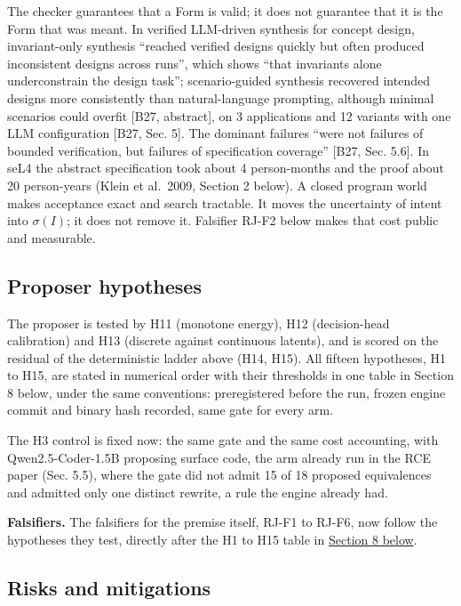 \documentclass[10pt,letterpaper]{article}
\begin{document}
The checker guarantees that a Form is valid; it does not guarantee that
it is the Form that was meant. In verified LLM-driven synthesis for
concept design, invariant-only synthesis ``reached verified designs
quickly but often produced inconsistent designs across runs'', which
shows ``that invariants alone underconstrain the design task'';
scenario-guided synthesis recovered intended designs more consistently
than natural-language prompting, although minimal scenarios could
overfit {[}B27, abstract{]}, on 3 applications and 12 variants with one
LLM configuration {[}B27, Sec. 5{]}. The dominant failures ``were not
failures of bounded verification, but failures of specification
coverage'' {[}B27, Sec. 5.6{]}. In seL4 the abstract specification took
about 4 person-months and the proof about 20 person-years (Klein et
al.~2009, Section 2 below). A closed program world makes acceptance
exact and search tractable. It moves the uncertainty of intent into
\(\sigma(I)\); it does not remove it. Falsifier RJ-F2 below makes that
cost public and measurable.

\subsection{Proposer hypotheses}\label{proposer-hypotheses}

The proposer is tested by H11 (monotone energy), H12 (decision-head
calibration) and H13 (discrete against continuous latents), and is
scored on the residual of the deterministic ladder above (H14, H15). All
fifteen hypotheses, H1 to H15, are stated in numerical order with their
thresholds in one table in Section 8 below, under the same conventions:
preregistered before the run, frozen engine commit and binary hash
recorded, same gate for every arm.

The H3 control is fixed now: the same gate and the same cost accounting,
with Qwen2.5-Coder-1.5B proposing surface code, the arm already run in
the RCE paper (Sec. 5.5), where the gate did not admit 15 of 18 proposed
equivalences and admitted only one distinct rewrite, a rule the engine
already had.

\textbf{Falsifiers.} The falsifiers for the premise itself, RJ-F1 to
RJ-F6, now follow the hypotheses they test, directly after the H1 to H15
table in
\href{https://research.openie.dev/papers/rce-jepa/\#falsifiers}{Section
8 below}.

\subsection{Risks and mitigations}\label{risks-and-mitigations}
\end{document}
